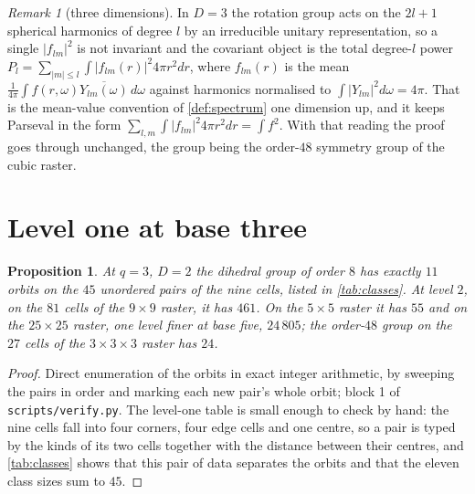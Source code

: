 \documentclass[11pt]{amsart}
\newtheorem{proposition}[theorem]{Proposition}
\theoremstyle{definition}
\theoremstyle{remark}
\newtheorem{remark}[theorem]{Remark}
\begin{document}
\begin{remark}[three dimensions]
\label{rem:3d}
In $D = 3$ the rotation group acts on the $2l+1$ spherical harmonics of degree $l$ by an irreducible unitary representation, so a single $|f_{lm}|^2$ is not invariant and the covariant object is the total degree-$l$ power $P_l = \sum_{|m| \le l} \int |f_{lm}(r)|^2 4\pi r^2 dr$, where $f_{lm}(r)$ is the mean $\frac{1}{4\pi}\int f(r,\omega) \overline{Y_{lm}(\omega)}\, d\omega$ against harmonics normalised to $\int |Y_{lm}|^2 d\omega = 4\pi$. That is the mean-value convention of \cref{def:spectrum} one dimension up, and it keeps Parseval in the form $\sum_{l,m} \int |f_{lm}|^2 4\pi r^2 dr = \int f^2$. With that reading the proof goes through unchanged, the group being the order-$48$ symmetry group of the cubic raster.
\end{remark}

\section{Level one at base three}
\label{sec:level1}

\begin{proposition}
\label{prop:classes}
At $q = 3$, $D = 2$ the dihedral group of order $8$ has exactly $11$ orbits on the $45$ unordered pairs of the nine cells, listed in \cref{tab:classes}. At level $2$, on the $81$ cells of the $9 \times 9$ raster, it has $461$. On the $5 \times 5$ raster it has $55$ and on the $25 \times 25$ raster, one level finer at base five, $24\,805$; the order-$48$ group on the $27$ cells of the $3 \times 3 \times 3$ raster has $24$.
\end{proposition}

\begin{proof}
Direct enumeration of the orbits in exact integer arithmetic, by sweeping the pairs in order and marking each new pair's whole orbit; block 1 of \texttt{scripts/verify.py}. The level-one table is small enough to check by hand: the nine cells fall into four corners, four edge cells and one centre, so a pair is typed by the kinds of its two cells together with the distance between their centres, and \cref{tab:classes} shows that this pair of data separates the orbits and that the eleven class sizes sum to $45$.
\end{proof}
\end{document}
